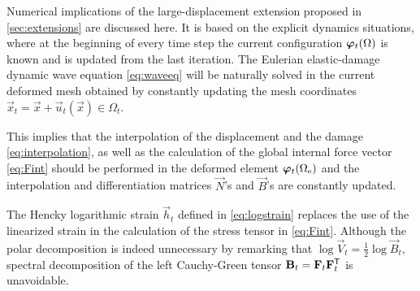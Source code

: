 \begin{remark}
Numerical implications of the large-displacement extension proposed in \cref{sec:extensions} are discussed here. It is based on the explicit dynamics situations, where at the beginning of every time step the current configuration $\vphi_t(\Omega)$ is known and is updated from the last iteration. The Eulerian elastic-damage dynamic wave equation \eqref{eq:waveeq} will be naturally solved in the current deformed mesh obtained by constantly updating the mesh coordinates $\vec{x}_t=\vec{x}+\vec{u}_t(\vec{x})\in\Omega_t$.

This implies that the interpolation of the displacement and the damage \eqref{eq:interpolation}, as well as the calculation of the global internal force vector \eqref{eq:Fint} should be performed in the deformed element $\vphi_t(\Omega_\mathrm{e})$ and the interpolation and differentiation matrices $\vec{N}$'s and $\vec{B}$'s are constantly updated.

The Hencky logarithmic strain $\vec{h}_t$ defined in \eqref{eq:logstrain} replaces the use of the linearized strain in the calculation of the stress tensor in \eqref{eq:Fint}. Although the polar decomposition is indeed unnecessary by remarking that $\log\vec{V}_t=\frac{1}{2}\log\vec{B}_t$, spectral decomposition of the left Cauchy-Green tensor $\vec{B}_t=\vec{F}_t\vec{F}_t^\mT$ is unavoidable.
\end{remark}

